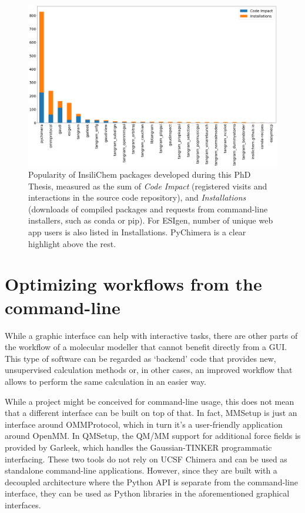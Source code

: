 \begin{figure}[H] %
	\begin{Center}
		\includegraphics[width=\textwidth]{./figures/05/ghstats.png}
	\end{Center}
	\cprotect\caption[Popularity of InsiliChem packages]{Popularity of InsiliChem packages developed during this PhD Thesis, measured as the sum of \textit{Code Impact} (registered visits and interactions in the source code repository), and \textit{Installations} (downloads of compiled packages and requests from command-line installers, such as conda or pip). For ESIgen, number of unique web app users is also listed in Installations. PyChimera is a clear highlight above the rest.}
	\label{fig:ghstats}
\end{figure}


\section{Optimizing workflows from the command-line}
While a graphic interface can help with interactive tasks, there are other parts of the workflow of a molecular modeller that cannot benefit directly from a GUI. This type of software can be regarded as ‘backend’ code that provides new, unsupervised calculation methods or, in other cases, an improved workflow that allows to perform the same calculation in an easier way.

While a project might be conceived for command-line usage, this does not mean that a different interface can be built on top of that. In fact, MMSetup is just an interface around OMMProtocol, which in turn it’s a user-friendly application around OpenMM. In QMSetup, the QM/MM support for additional force fields is provided by Garleek, which handles the Gaussian-TINKER programmatic interfacing. These two tools do not rely on UCSF Chimera and can be used as standalone command-line applications. However, since they are built with a decoupled architecture where the Python API is separate from the command-line interface, they can be used as Python libraries in the aforementioned graphical interfaces.

